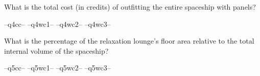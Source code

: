 \question   What is the total cost (in credits) of outfitting the entire spaceship with panels?

\begin{randomizechoices}
\correctchoice --q4cc-- 
\choice --q4wc1--  
\choice --q4wc2-- 
\choice --q4wc3-- 
\end{randomizechoices}

\question   What is the percentage of the relaxation lounge's floor area relative to the total internal volume of the spaceship?

\begin{randomizechoices}
\correctchoice --q5cc-- 
\choice --q5wc1--  
\choice --q5wc2-- 
\choice --q5wc3-- 
\end{randomizechoices}
